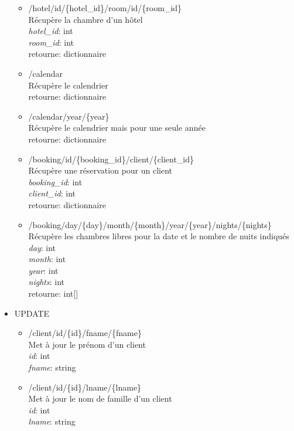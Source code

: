 \documentclass{article}
\begin{document}
\begin{itemize}
\begin{itemize}
	\item /hotel/id/\{hotel\_id\}/room/id/\{room\_id\}\\
		R\'ecup\`ere la chambre d'un h\^{o}tel \\
		\textit{hotel\_id}: int \\
		\textit{room\_id}: int \\
		retourne: dictionnaire

	\item /calendar\\
		R\'ecup\`ere le calendrier \\
		retourne: dictionnaire


	\item /calendar/year/\{year\}\\
		R\'ecup\`ere le calendrier mais pour une seule ann\'ee \\
		retourne: dictionnaire


	\item /booking/id/\{booking\_id\}/client/\{client\_id\}\\
		R\'ecup\`ere une r\'eservation pour un client \\
		\textit{booking\_id}: int \\
		\textit{client\_id}: int \\
		retourne: dictionnaire


	\item /booking/day/\{day\}/month/\{month\}/year/\{year\}/nights/\{nights\} \\
		R\'ecup\`ere les chambres libres pour la date et le nombre de nuits indiqu\'es \\
		\textit{day}: int \\
		\textit{month}: int \\
		\textit{year}: int \\
		\textit{nights}: int \\
		retourne: int[]
	\end{itemize}

	\pagebreak
\item UPDATE
	\begin{itemize}

		\item /client/id/\{id\}/fname/\{fname\}\\
		Met \`a jour le pr\'enom d'un client \\
		\textit{id}: int \\
		\textit{fname}: string


	\item /client/id/\{id\}/lname/\{lname\}\\
		Met \`a jour le nom de famille d'un client \\
		\textit{id}: int \\
		\textit{lname}: string


\end{itemize}
\end{itemize}
\end{document}

